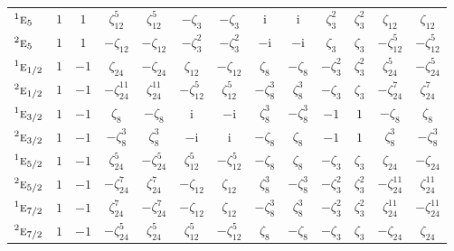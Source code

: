 \documentclass[10pt,a4paper]{article}
\makeatletter
\def\grouprule#1#2{\noalign{\marks\LTgroupmarks{\the\belowrulesep}\nobreak\vskip#1%
  \vskip\aboverulesep}\multispan\LT@cols\unskip{\leaders\hrule\@height#2\hfill\kern\z@}\cr
  \noalign{\penalty\LTrulebreak\vskip\belowrulesep\global\@lastruleclass\z@}}
\numberwithin{equation}{section}
\newcommand{\irr}[1]{\text{\normalfont\scshape #1}}
\newcommand{\conjpair}[1]{{}^{#1}}
\newcommand{\iunit}{\mathrm{i}}
\newcommand{\rootunity}[1]{\zeta_{#1}}
\makeatother
\begin{document}
{\begin{longtable}{@{}lcccccccccccc@{}}
$\conjpair{1}\irr{e}_{5}$ & $1$ & $1$ & $\rootunity{12}^{5}$ & $\rootunity{12}^{5}$ & $-\rootunity{3}$ & $-\rootunity{3}$ & $\iunit{}$ & $\iunit{}$ & $\rootunity{3}^{2}$ & $\rootunity{3}^{2}$ & $\rootunity{12}$ & $\rootunity{12}$\\
$\conjpair{2}\irr{e}_{5}$ & $1$ & $1$ & $-\rootunity{12}$ & $-\rootunity{12}$ & $-\rootunity{3}^{2}$ & $-\rootunity{3}^{2}$ & $-\iunit{}$ & $-\iunit{}$ & $\rootunity{3}$ & $\rootunity{3}$ & $-\rootunity{12}^{5}$ & $-\rootunity{12}^{5}$\\
\grouprule{0pt}{\lightrulewidth}
$\conjpair{1}\irr{e}_{1/2}$ & $1$ & $-1$ & $\rootunity{24}$ & $-\rootunity{24}$ & $\rootunity{12}$ & $-\rootunity{12}$ & $\rootunity{8}$ & $-\rootunity{8}$ & $-\rootunity{3}^{2}$ & $\rootunity{3}^{2}$ & $\rootunity{24}^{5}$ & $-\rootunity{24}^{5}$\\
$\conjpair{2}\irr{e}_{1/2}$ & $1$ & $-1$ & $-\rootunity{24}^{11}$ & $\rootunity{24}^{11}$ & $-\rootunity{12}^{5}$ & $\rootunity{12}^{5}$ & $-\rootunity{8}^{3}$ & $\rootunity{8}^{3}$ & $-\rootunity{3}$ & $\rootunity{3}$ & $-\rootunity{24}^{7}$ & $\rootunity{24}^{7}$\\
$\conjpair{1}\irr{e}_{3/2}$ & $1$ & $-1$ & $\rootunity{8}$ & $-\rootunity{8}$ & $\iunit{}$ & $-\iunit{}$ & $\rootunity{8}^{3}$ & $-\rootunity{8}^{3}$ & $-1$ & $1$ & $-\rootunity{8}$ & $\rootunity{8}$\\
$\conjpair{2}\irr{e}_{3/2}$ & $1$ & $-1$ & $-\rootunity{8}^{3}$ & $\rootunity{8}^{3}$ & $-\iunit{}$ & $\iunit{}$ & $-\rootunity{8}$ & $\rootunity{8}$ & $-1$ & $1$ & $\rootunity{8}^{3}$ & $-\rootunity{8}^{3}$\\
$\conjpair{1}\irr{e}_{5/2}$ & $1$ & $-1$ & $\rootunity{24}^{5}$ & $-\rootunity{24}^{5}$ & $\rootunity{12}^{5}$ & $-\rootunity{12}^{5}$ & $-\rootunity{8}$ & $\rootunity{8}$ & $-\rootunity{3}$ & $\rootunity{3}$ & $\rootunity{24}$ & $-\rootunity{24}$\\
$\conjpair{2}\irr{e}_{5/2}$ & $1$ & $-1$ & $-\rootunity{24}^{7}$ & $\rootunity{24}^{7}$ & $-\rootunity{12}$ & $\rootunity{12}$ & $\rootunity{8}^{3}$ & $-\rootunity{8}^{3}$ & $-\rootunity{3}^{2}$ & $\rootunity{3}^{2}$ & $-\rootunity{24}^{11}$ & $\rootunity{24}^{11}$\\
$\conjpair{1}\irr{e}_{7/2}$ & $1$ & $-1$ & $\rootunity{24}^{7}$ & $-\rootunity{24}^{7}$ & $-\rootunity{12}$ & $\rootunity{12}$ & $-\rootunity{8}^{3}$ & $\rootunity{8}^{3}$ & $-\rootunity{3}^{2}$ & $\rootunity{3}^{2}$ & $\rootunity{24}^{11}$ & $-\rootunity{24}^{11}$\\
$\conjpair{2}\irr{e}_{7/2}$ & $1$ & $-1$ & $-\rootunity{24}^{5}$ & $\rootunity{24}^{5}$ & $\rootunity{12}^{5}$ & $-\rootunity{12}^{5}$ & $\rootunity{8}$ & $-\rootunity{8}$ & $-\rootunity{3}$ & $\rootunity{3}$ & $-\rootunity{24}$ & $\rootunity{24}$\\

\end{longtable}}
\end{document}
